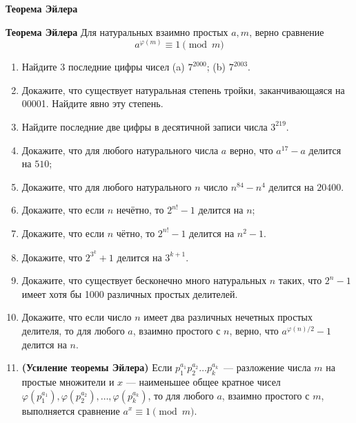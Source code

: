 \documentclass{article}
\begin{document}
\large
	
\begin{center}
	\textbf{Теорема Эйлера}
\end{center}


\textbf{Теорема Эйлера} Для натуральных взаимно простых $a, m$, верно сравнение $$a^{\varphi(m)} \equiv 1 \pmod m$$


\begin{enumerate}[label*=\protect\fbox{\arabic{enumi}}]

\item Найдите $3$ последние цифры чисел (a) $7^{2000}$; (b) $7^{2003}$.

\item Докажите, что существует натуральная степень тройки, заканчивающаяся на 00001. Найдите явно эту степень.

\item Найдите последние две цифры в десятичной записи числа $3^{219}$.

\item Докажите, что для любого натурального числа $a$ верно, что $a^{17} - a$ делится на $510$;

\item Докажите, что для любого натурального $n$ число $n^{84} - n^4$ делится на $20400$.

\item Докажите, что если $n$ нечётно, то $2^{n!} - 1$ делится на $n$;

\item Докажите, что если $n$ чётно, то $2^{n!} - 1$ делится на $n^2 - 1$. 

\item Докажите, что $2^{3^k} + 1$ делится на $3^{k + 1}$.

\item Докажите, что существует бесконечно много натуральных $n$ таких, что $2^n - 1$ имеет хотя бы 1000 различных простых делителей.

\item Докажите, что если число $n$ имеет два различных нечетных простых делителя, то для любого $a$, взаимно простого с $n$, верно, что $a^{\varphi(n) / 2} - 1$ делится на $n$.

\item \textbf{(Усиление теоремы Эйлера)} Если $p_1^{a_1}p_2^{a_2}\ldots p_k^{a_k}$~--- разложение числа $m$ на простые множители и $x$ --- наименьшее общее кратное чисел $\varphi(p_1^{a_1}), \varphi(p_2^{a_2}),\ldots, \varphi(p_k^{a_k})$, то для любого $a$, взаимно простого с $m$, выполняется сравнение $a^x \equiv 1\pmod m$.


\end{enumerate}
\end{document}

